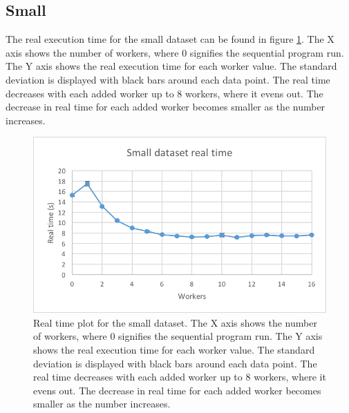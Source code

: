 \subsection{Small}
The real execution time for the small dataset can be found in figure \ref{fig:dataset_2_real_time}.
The X axis shows the number of workers, where 0 signifies the sequential program run.
The Y axis shows the real execution time for each worker value. The standard deviation is displayed with black bars around each data point. The real time
decreases with each added worker up to 8 workers, where it evens out. The decrease in real time for each added worker becomes smaller as the number increases.
\begin{figure}[ht]
  \centering
  \includegraphics[width=120mm]{figures/dataset_2/dataset_2_real_time.png}
  \caption[Real time plot for the small dataset.]{Real time plot for the small dataset. The X axis shows the number of workers, where 0 signifies the sequential program run.
  The Y axis shows the real execution time for each worker value. The standard deviation is displayed with black bars around each data point. The real time
  decreases with each added worker up to 8 workers, where it evens out. The decrease in real time for each added worker becomes smaller as the number increases.}
  \label{fig:dataset_2_real_time}
\end{figure}

